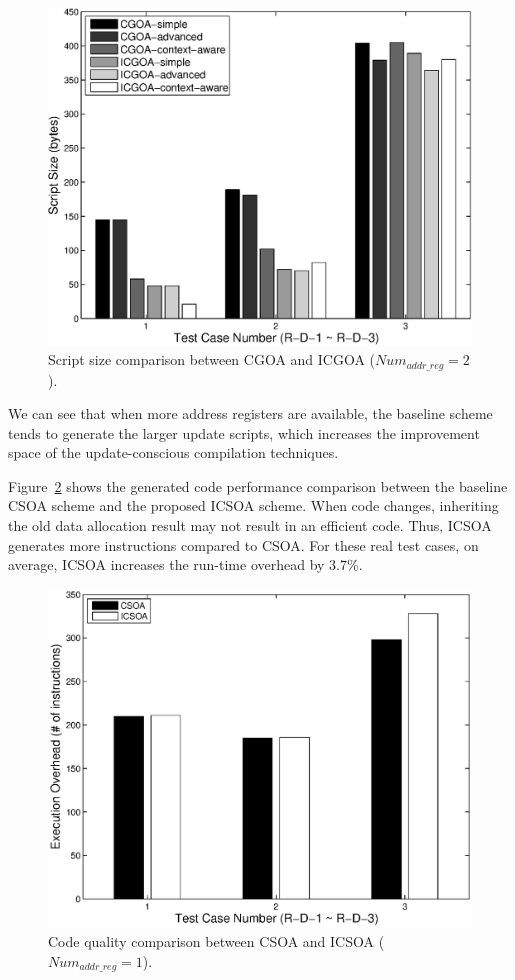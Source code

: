 \begin{figure}[htbp]
\centering
\includegraphics[scale=0.6]{./figures/updatem2.eps}
\caption{Script size comparison between CGOA and ICGOA ($Num_{addr\_reg} = 2$).}
\label{update2-dsp-real}
\vspace{-0.1in}
\end{figure}

We can see that when more address registers are available, the baseline scheme tends to generate the larger update 
scripts, which increases the improvement space of the update-conscious compilation techniques.

Figure~\ref{exe-dsp-real} shows the generated code performance comparison between the baseline CSOA scheme and the 
proposed ICSOA scheme. When code changes, inheriting the old data allocation result may not result in an efficient 
code. Thus, ICSOA generates more instructions compared to CSOA. For these real test cases, on average, ICSOA increases 
the run-time overhead by 3.7\%. 
\begin{figure}[htbp]
\centering
\includegraphics[scale=0.6]{figures/da-exe2.eps}
\caption{Code quality comparison between CSOA and ICSOA ($Num_{addr\_reg} = 1$).}
\label{exe-dsp-real}
\vspace{-0.2in}
\end{figure}


